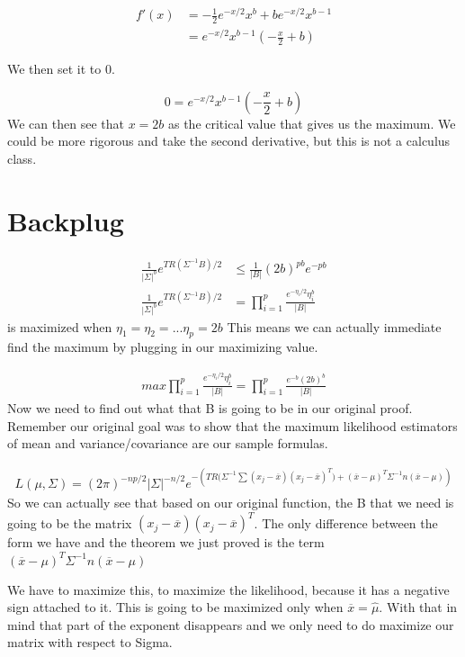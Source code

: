 \begin{align*}
f'(x) &= -\frac{1}{2}e^{-x/2}x^b +be^{-x/2}x^{b-1}    \\
&= e^{-x/2}x^{b-1}(-\frac{x}{2} +b)
\end{align*}

We then set it to 0.

\[0 = e^{-x/2}x^{b-1}(-\frac{x}{2} +b)\]
We can then see that $x=2b$ as the critical value that gives us the maximum. We could be more rigorous and take the second derivative, but this is not a calculus class.

\section{Backplug}

\begin{align*}
    \frac{1}{|\Sigma|^b}e^{TR(\Sigma^{-1}B)/2} &\leq
    \frac{1}{|B|}(2b)^{pb}e^{-pb}\\
    \frac{1}{|\Sigma|^b}e^{TR(\Sigma^{-1}B)/2} &= \displaystyle\prod_{i=1}^p \frac{e^{-\eta_i/2}\eta_i^b}{|B|}
\end{align*}
is maximized when $\eta_1=\eta_2 = ... \eta_p =2b$
This means we can actually immediate find the maximum by plugging in our maximizing value.

\begin{align*}
    max\displaystyle\prod_{i=1}^p  \frac{e^{-\eta_i/2}\eta_i^b}{|B|} = \displaystyle\prod_{i=1}^p 
    \frac{e^{-b}(2b)^b}{|B|}
\end{align*}
Now we need to find out what that B is going to be in our original proof. Remember our original goal was to show that the maximum likelihood estimators of mean and variance/covariance are our sample formulas.

\begin{gather*}
    L(\mu,\Sigma) = (2\pi)^{-np/2}|\Sigma|^{-n/2}e^{-(
    TR \big(\Sigma^{-1} \sum(x_j-\overline{x})(x_j-\overline{x})^T \big)
    +
    (\overline{x}-\mu)^T\Sigma^{-1} n (\overline{x}-\mu))
    }
\end{gather*}
So we can actually see that based on our original function, the B that we need is going to be the matrix $(x_j-\overline{x})(x_j-\overline{x})^T$. The only difference between the form we have and the theorem we just proved is the term $(\overline{x}-\mu)^T\Sigma^{-1} n (\overline{x}-\mu)$

We have to maximize this, to maximize the likelihood, because it has a negative sign attached to it.
This is going to be maximized only when $\overline{x} = \hat \mu$. With that in mind that part of the exponent disappears  and we only need to do maximize our matrix with respect to Sigma.

